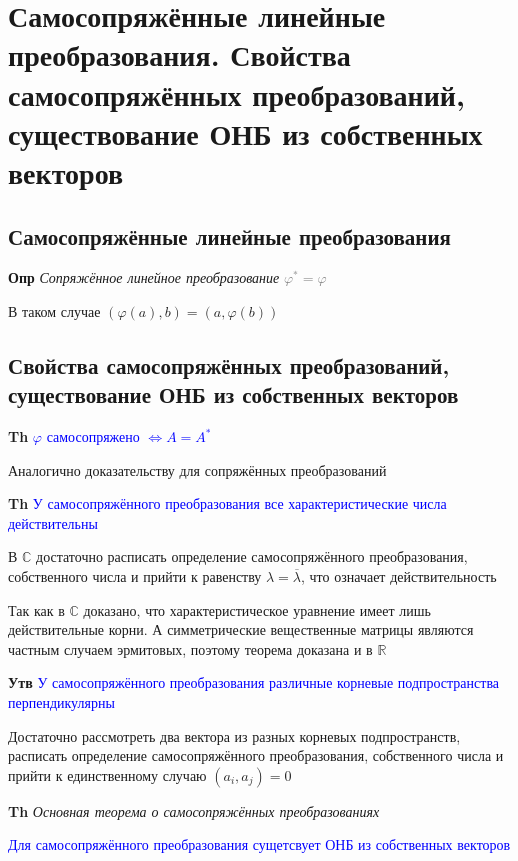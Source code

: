 \documentclass[a4paper, 14pt]{article}
\begin{document}
    \section{Самосопряжённые линейные преобразования.
    Свойства самосопряжённых преобразований, существование ОНБ из собственных векторов}
    
    \subsection{Самосопряжённые линейные преобразования}
    
    \textbf{Опр} \textit{Сопряжённое линейное преобразование} \textcolor{gray}{$\varphi^* = \varphi$}
    
    В таком случае $(\varphi (a), b) = (a, \varphi(b))$
    
    \subsection{Свойства самосопряжённых преобразований, существование ОНБ из собственных векторов}
    
    \textbf{Th} \textcolor{blue}{$\varphi$ самосопряжено $\Leftrightarrow A = A^*$}
    
    Аналогично доказательству для сопряжённых преобразований
    
    \textbf{Th} \textcolor{blue}{У самосопряжённого преобразования все характеристические числа действительны}
    
    В $\mathbb{C}$ достаточно расписать определение самосопряжённого преобразования, собственного числа и прийти к
    равенству $\lambda = \overline{\lambda}$, что означает действительность
    
    Так как в $\mathbb{C}$ доказано, что характеристическое уравнение имеет лишь действительные корни.
    А симметрические вещественные матрицы являются частным случаем эрмитовых, поэтому теорема доказана и в $\mathbb{R}$
    
    \textbf{Утв} \textcolor{blue}{У самосопряжённого преобразования различные корневые подпространства перпендикулярны}
    
    Достаточно рассмотреть два вектора из разных корневых подпространств, расписать определение самосопряжённого
    преобразования, собственного числа и прийти к единственному случаю $(a_i, a_j) = 0$
    
    \textbf{Th} \textit{Основная теорема о самосопряжённых преобразованиях}
    
    \textcolor{blue}{Для самосопряжённого преобразования сущетсвует ОНБ из собственных векторов}
    
\end{document}

